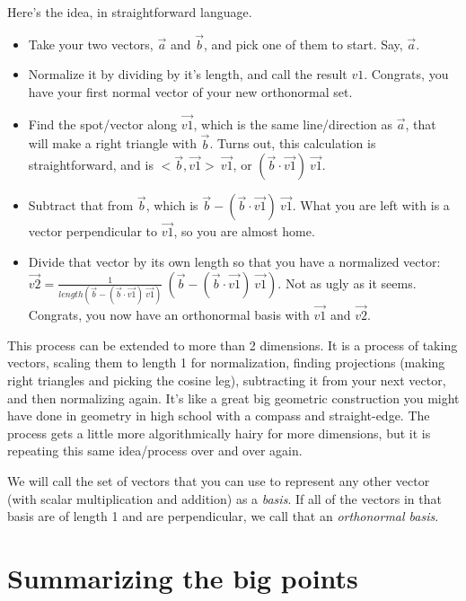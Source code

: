 \documentclass[
]{book}
\providecommand{\tightlist}{%
  \setlength{\itemsep}{0pt}\setlength{\parskip}{0pt}}
\begin{document}
Here's the idea, in straightforward language.

\begin{itemize}
\tightlist
\item
  Take your two vectors, \(\vec{a}\) and \(\vec{b}\), and pick one of them to start. Say, \(\vec{a}\).
\item
  Normalize it by dividing by it's length, and call the result \(v1\). Congrats, you have your first normal vector of your new orthonormal set.
\item
  Find the spot/vector along \(\vec{v1}\), which is the same line/direction as \(\vec{a}\), that will make a right triangle with \(\vec{b}\). Turns out, this calculation is straightforward, and is \(<\vec{b},\vec{v1}>\ \vec{v1}\), or \((\vec{b}\cdot\vec{v1})\ \vec{v1}\).
\item
  Subtract that from \(\vec{b}\), which is \(\vec{b} - (\vec{b}\cdot\vec{v1})\ \vec{v1}\). What you are left with is a vector perpendicular to \(\vec{v1}\), so you are almost home.
\item
  Divide that vector by its own length so that you have a normalized vector: \(\vec{v2} = \frac{1}{length(\vec{b} - (\vec{b}\cdot\vec{v1})\ \vec{v1})}\ (\vec{b} - (\vec{b}\cdot\vec{v1})\ \vec{v1})\). Not as ugly as it seems. Congrats, you now have an orthonormal basis with \(\vec{v1}\) and \(\vec{v2}\).
\end{itemize}

This process can be extended to more than 2 dimensions. It is a process of taking vectors, scaling them to length 1 for normalization, finding projections (making right triangles and picking the cosine leg), subtracting it from your next vector, and then normalizing again. It's like a great big geometric construction you might have done in geometry in high school with a compass and straight-edge. The process gets a little more algorithmically hairy for more dimensions, but it is repeating this same idea/process over and over again.

We will call the set of vectors that you can use to represent any other vector (with scalar multiplication and addition) as a \emph{basis}. If all of the vectors in that basis are of length 1 and are perpendicular, we call that an \emph{orthonormal basis}.

\hypertarget{summarizing-the-big-points}{%
\section{Summarizing the big points}\label{summarizing-the-big-points}}
\end{document}

